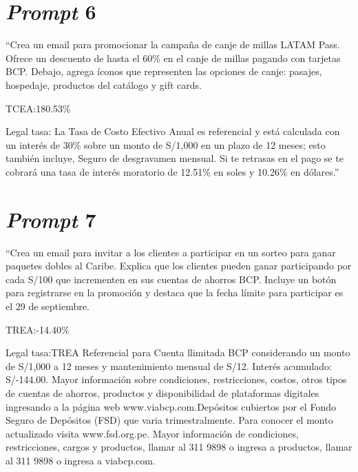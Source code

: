 \section{\textit{Prompt} 6}

``Crea un email para promocionar la campaña de canje de millas LATAM Pass. Ofrece un descuento de hasta el 60\% en el canje de millas pagando con tarjetas BCP. Debajo, agrega íconos que representen las opciones de canje: pasajes, hospedaje, productos del catálogo y gift cards.

TCEA:180.53\%

Legal tasa: La Tasa de Costo Efectivo Anual es referencial y está calculada con un interés de 30\% sobre un monto de S/1,000 en un plazo de 12 meses; esto también incluye, Seguro de desgravamen mensual. Si te retrasas en el pago se te cobrará una tasa de interés moratorio de 12.51\% en soles y 10.26\% en dólares.''

\section{\textit{Prompt} 7}

``Crea un email para invitar a los clientes a participar en un sorteo para ganar paquetes dobles al Caribe. Explica que los clientes pueden ganar participando por cada S/100 que incrementen en sus cuentas de ahorros BCP. Incluye un botón para registrarse en la promoción y destaca que la fecha límite para participar es el 29 de septiembre.

TREA:-14.40\%

Legal tasa:TREA Referencial para Cuenta llimitada BCP considerando un monto de S/1,000 a 12 meses y mantenimiento mensual de S/12. Interés acumulado: S/-144.00. Mayor información sobre condiciones, restricciones, costos, otros tipos de cuentas de ahorros, productos y disponibilidad de plataformas digitales ingresando a la página web www.viabcp.com.Depósitos cubiertos por el Fondo Seguro de Depósitos (FSD) que varia trimestralmente. Para conocer el monto actualizado visita www.fsd.org.pe. Mayor información de condiciones, restricciones, cargos y productos, llamar al 311 9898 o ingresa a productos, llamar al 311 9898 o ingresa a viabcp.com.

